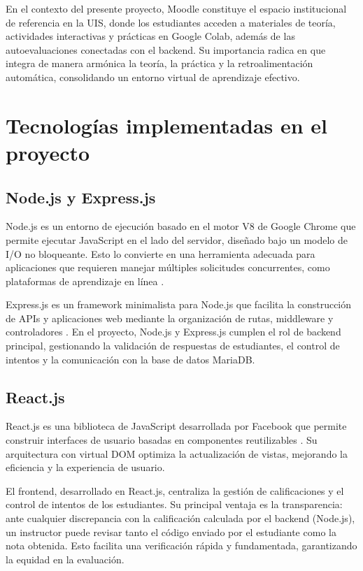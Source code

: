 \documentclass[letter,oneside,12pt,spanish]{report}
\begin{document}
En el contexto del presente proyecto, Moodle constituye el espacio institucional de referencia en la UIS, donde los estudiantes acceden a materiales de teoría, actividades interactivas y prácticas en Google Colab, además de las autoevaluaciones conectadas con el backend. Su importancia radica en que integra de manera armónica la teoría, la práctica y la retroalimentación automática, consolidando un entorno virtual de aprendizaje efectivo.



\section{Tecnologías implementadas en el proyecto}

\subsection{Node.js y Express.js}

Node.js es un entorno de ejecución basado en el motor V8 de Google Chrome que permite ejecutar JavaScript en el lado del servidor, diseñado bajo un modelo de I/O no bloqueante. Esto lo convierte en una herramienta adecuada para aplicaciones que requieren manejar múltiples solicitudes concurrentes, como plataformas de aprendizaje en línea \parencite{tilkov2010}.

Express.js es un framework minimalista para Node.js que facilita la construcción de APIs y aplicaciones web mediante la organización de rutas, middleware y controladores \parencite{brown2019}. En el proyecto, Node.js y Express.js cumplen el rol de backend principal, gestionando la validación de respuestas de estudiantes, el control de intentos y la comunicación con la base de datos MariaDB.

\subsection{React.js}

React.js es una biblioteca de JavaScript desarrollada por Facebook que permite construir interfaces de usuario basadas en componentes reutilizables \parencite{banks2017}. Su arquitectura con virtual DOM optimiza la actualización de vistas, mejorando la eficiencia y la experiencia de usuario.

El frontend, desarrollado en React.js, centraliza la gestión de calificaciones y el control de intentos de los estudiantes. Su principal ventaja es la transparencia: ante cualquier discrepancia con la calificación calculada por el backend (Node.js), un instructor puede revisar tanto el código enviado por el estudiante como la nota obtenida. Esto facilita una verificación rápida y fundamentada, garantizando la equidad en la evaluación.
\end{document}
